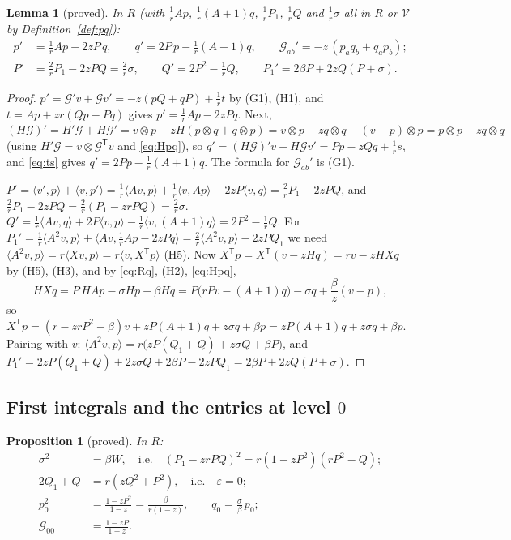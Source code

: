 \documentclass[11pt]{article}
\newtheorem{proposition}[theorem]{Proposition}
\newtheorem{lemma}[theorem]{Lemma}
\theoremstyle{definition}
\theoremstyle{remark}
\begin{document}
\begin{lemma}[proved]\label{lem:odes}
In $R$ (with $\frac1rAp$, $\frac1r(A+1)q$, $\frac1rP_1$, $\frac1rQ$ and $\frac1r\sigma$ all in $R$ or $\mathcal V$ by Definition~\ref{def:pq}):
\begin{align}
p'&=\tfrac1rAp-2zP\,q,\qquad q'=2P\,p-\tfrac1r(A+1)q,\qquad \mathcal G_{ab}'=-z\,(p_aq_b+q_ap_b);\label{eq:pqode}\\
P'&=\tfrac2rP_1-2zPQ=\tfrac2r\sigma,\qquad Q'=2P^2-\tfrac1rQ,\qquad P_1'=2\beta P+2zQ(P+\sigma).\label{eq:scalode}
\end{align}
\end{lemma}

\begin{proof}
$p'=\mathcal G'v+\mathcal Gv'=-z(pQ+qP)+\frac1rt$ by (G1), (H1), and $t=Ap+zr(Qp-Pq)$ gives $p'=\frac1rAp-2zPq$. Next, $(H\mathcal G)'=H'\mathcal G+H\mathcal G'=v\otimes p-zH(p\otimes q+q\otimes p)=v\otimes p-zq\otimes q-(v-p)\otimes p=p\otimes p-zq\otimes q$ (using $H'\mathcal G=v\otimes\mathcal G^{\mathsf T}v$ and \eqref{eq:Hpq}), so $q'=(H\mathcal G)'v+H\mathcal Gv'=Pp-zQq+\frac1rs$, and \eqref{eq:ts} gives $q'=2Pp-\frac1r(A+1)q$. The formula for $\mathcal G_{ab}'$ is (G1).

$P'=\langle v',p\rangle+\langle v,p'\rangle=\frac1r\langle Av,p\rangle+\frac1r\langle v,Ap\rangle-2zP\langle v,q\rangle=\frac2rP_1-2zPQ$, and $\frac2rP_1-2zPQ=\frac2r(P_1-zrPQ)=\frac2r\sigma$. $Q'=\frac1r\langle Av,q\rangle+2P\langle v,p\rangle-\frac1r\langle v,(A+1)q\rangle=2P^2-\frac1rQ$. For $P_1'=\frac1r\langle A^2v,p\rangle+\langle Av,\frac1rAp-2zPq\rangle=\frac2r\langle A^2v,p\rangle-2zPQ_1$ we need $\langle A^2v,p\rangle=r\langle Xv,p\rangle=r\langle v,X^{\mathsf T}p\rangle$ (H5). Now $X^{\mathsf T}p=X^{\mathsf T}(v-zHq)=rv-zHXq$ by (H5), (H3), and by \eqref{eq:Rq}, (H2), \eqref{eq:Hpq},
\[
HXq=P\,HAp-\sigma Hp+\beta Hq=P\bigl(rPv-(A+1)q\bigr)-\sigma q+\frac\beta z(v-p),
\]
so $X^{\mathsf T}p=(r-zrP^2-\beta)v+zP(A+1)q+z\sigma q+\beta p=zP(A+1)q+z\sigma q+\beta p$. Pairing with $v$: $\langle A^2v,p\rangle=r\bigl(zP(Q_1+Q)+z\sigma Q+\beta P\bigr)$, and $P_1'=2zP(Q_1+Q)+2z\sigma Q+2\beta P-2zPQ_1=2\beta P+2zQ(P+\sigma)$.
\end{proof}

\subsection{First integrals and the entries at level $0$}

\begin{proposition}[proved]\label{prop:level0}
In $R$:
\begin{align}
\sigma^2&=\beta W,\quad\text{i.e.}\quad (P_1-zrPQ)^2=r(1-zP^2)(rP^2-Q);\tag{I1}\label{eq:I1}\\
2Q_1+Q&=r(zQ^2+P^2),\quad\text{i.e.}\quad\varepsilon=0;\tag{I2}\label{eq:I2}\\
p_0^2&=\frac{1-zP^2}{1-z}=\frac{\beta}{r(1-z)},\qquad q_0=\frac{\sigma}{\beta}\,p_0;\tag{I3}\label{eq:I3}\\
\mathcal G_{00}&=\frac{1-zP}{1-z}.\tag{I4}\label{eq:I4}
\end{align}
\end{proposition}
\end{document}
